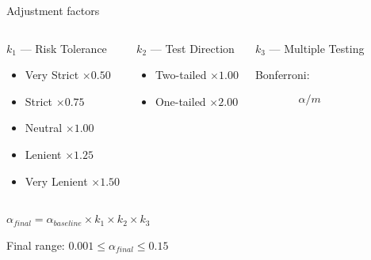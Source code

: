 \begin{frame}{Adjustment factors}
	
	\begin{columns}[T]
		
		\begin{block}{$k_1$ — Risk Tolerance}
			
			\begin{itemize}
				\item Very Strict $\times 0.50$
				\item Strict $\times 0.75$
				\item Neutral $\times 1.00$
				\item Lenient $\times 1.25$
				\item Very Lenient $\times 1.50$
			\end{itemize}
			
		\end{block}
		
		
		\begin{block}{$k_2$ — Test Direction}
			
			\begin{itemize}
				\item Two-tailed $\times 1.00$
				\item One-tailed $\times 2.00$
			\end{itemize}
			
		\end{block}
		
		
		\begin{block}{$k_3$ — Multiple Testing}
			
			Bonferroni:
			
			\[
			\alpha / m
			\]
			
		\end{block}
		
	\end{columns}
	
	\vspace{0.4cm}
	
	\centering
	
	\textbf{
		$\alpha_{final}
		=
		\alpha_{baseline}
		\times
		k_1
		\times
		k_2
		\times
		k_3$
	}
	
	\vspace{0.2cm}
	
	\small
	Final range: $0.001 \leq \alpha_{final} \leq 0.15$
	
\end{frame}
	

